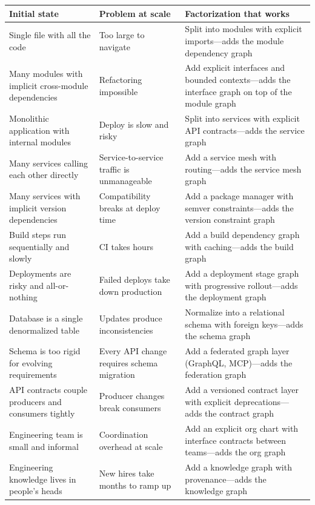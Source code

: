 \documentclass[11pt]{article}
\begin{document}
\begin{longtable}{|p{}|p{}|p{}|}
\hline
\textbf{Initial state} & \textbf{Problem at scale} & \textbf{Factorization that works} \\
\hline
\endhead
Single file with all the code & Too large to navigate & Split into modules with explicit imports---adds the module dependency graph \\
\hline
Many modules with implicit cross-module dependencies & Refactoring impossible & Add explicit interfaces and bounded contexts---adds the interface graph on top of the module graph \\
\hline
Monolithic application with internal modules & Deploy is slow and risky & Split into services with explicit API contracts---adds the service graph \\
\hline
Many services calling each other directly & Service-to-service traffic is unmanageable & Add a service mesh with routing---adds the service mesh graph \\
\hline
Many services with implicit version dependencies & Compatibility breaks at deploy time & Add a package manager with semver constraints---adds the version constraint graph \\
\hline
Build steps run sequentially and slowly & CI takes hours & Add a build dependency graph with caching---adds the build graph \\
\hline
Deployments are risky and all-or-nothing & Failed deploys take down production & Add a deployment stage graph with progressive rollout---adds the deployment graph \\
\hline
Database is a single denormalized table & Updates produce inconsistencies & Normalize into a relational schema with foreign keys---adds the schema graph \\
\hline
Schema is too rigid for evolving requirements & Every API change requires schema migration & Add a federated graph layer (GraphQL, MCP)---adds the federation graph \\
\hline
API contracts couple producers and consumers tightly & Producer changes break consumers & Add a versioned contract layer with explicit deprecations---adds the contract graph \\
\hline
Engineering team is small and informal & Coordination overhead at scale & Add an explicit org chart with interface contracts between teams---adds the org graph \\
\hline
Engineering knowledge lives in people's heads & New hires take months to ramp up & Add a knowledge graph with provenance---adds the knowledge graph \\
\hline
\end{longtable}
\end{document}
